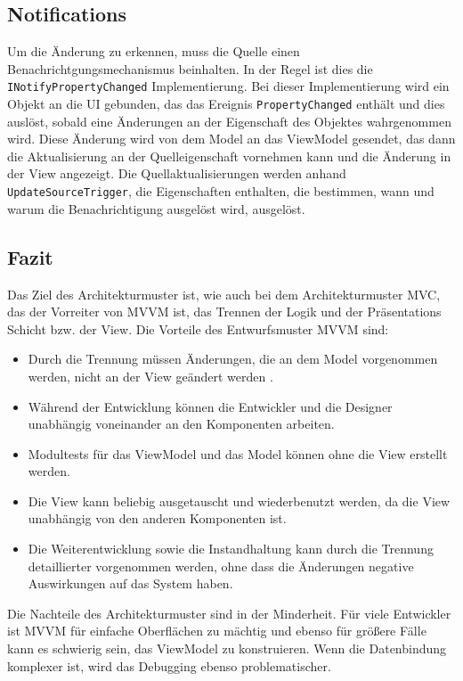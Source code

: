 \subsection*{Notifications}
Um die \"Anderung zu erkennen, muss die Quelle einen Benachrichtgungsmechanismus beinhalten. In der Regel ist dies die \texttt{INotifyPropertyChanged} Implementierung. Bei dieser Implementierung wird ein Objekt an die UI gebunden, das das Ereignis \texttt{PropertyChanged} enth\"alt und dies ausl\"ost, sobald eine \"Anderungen an der Eigenschaft des Objektes wahrgenommen wird. Diese \"Anderung wird von dem Model an das ViewModel gesendet, das dann die Aktualisierung an der Quelleigenschaft vornehmen kann und die \"Anderung in der View angezeigt.
Die Quellaktualisierungen werden anhand \texttt{UpdateSourceTrigger}, die Eigenschaften enthalten, die bestimmen, wann und warum die Benachrichtigung ausgel\"ost wird,  ausgel\"ost. 


\subsection*{Fazit}
Das Ziel des Architekturmuster ist, wie auch bei dem Architekturmuster \ac{MVC}, das der Vorreiter von \ac{MVVM} ist, das Trennen der Logik und der Pr\"asentations Schicht bzw. der View.
Die Vorteile des Entwurfsmuster \ac{MVVM} sind:
\begin{itemize}
\item Durch die Trennung m\"ussen \"Anderungen, die an dem Model vorgenommen werden, nicht an der View ge\"andert werden\cite{tutorialspointMVVM} .
\item W\"ahrend der Entwicklung k\"onnen die Entwickler und die Designer unabh\"angig voneinander an den Komponenten arbeiten\cite{Pete2016}.
\item Modultests f\"ur das ViewModel und das Model k\"onnen ohne die View erstellt werden\cite{Pete2016}.
\item Die View kann beliebig ausgetauscht und wiederbenutzt werden, da die View unabh\"angig von den anderen Komponenten ist\cite{Pete2016}.
\item Die Weiterentwicklung sowie die Instandhaltung kann durch die Trennung detaillierter vorgenommen werden, ohne dass die  \"Anderungen negative Auswirkungen auf das System haben\cite{tutorialspointMVVM}.
\end{itemize}
Die Nachteile des Architekturmuster sind in der Minderheit.
F\"ur viele Entwickler ist \ac{MVVM} f\"ur einfache Oberfl\"achen zu m\"achtig und ebenso f\"ur gr\"o\ss{}ere F\"alle kann es schwierig sein, das ViewModel zu konstruieren.
Wenn die Datenbindung komplexer ist, wird das Debugging ebenso problematischer\cite{tutorialspointMVVM}.

